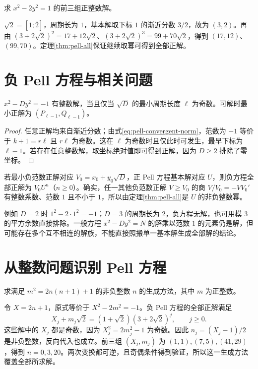 \documentclass[UTF8,12pt,a4paper,fontset=fandol]{ctexbook}
\begin{document}
\begin{example}
求 $x^2-2y^2=1$ 的前三组正整数解。
\end{example}
\begin{solve}
$\sqrt2=[1;\overline2]$，周期长为 $1$，基本解取下标 $1$ 的渐近分数 $3/2$，故为 $(3,2)$。再由 $(3+2\sqrt2)^2=17+12\sqrt2$、$(3+2\sqrt2)^3=99+70\sqrt2$，得到 $(17,12)$、$(99,70)$。定理\ref{thm:pell-all}保证继续取幂可得到全部正解。
\end{solve}

\section{负 Pell 方程与相关问题}

\begin{proposition}
\label{prop:negative-pell}
$x^2-Dy^2=-1$ 有整数解，当且仅当 $\sqrt D$ 的最小周期长度 $\ell$ 为奇数。可解时最小正解为 $(P_{\ell-1},Q_{\ell-1})$。
\end{proposition}
\begin{proof}
任意正解均来自渐近分数；由式\eqref{eq:pell-convergent-norm}，范数为 $-1$ 等价于 $k+1=r\ell$ 且 $r\ell$ 为奇数。这在 $\ell$ 为奇数时且仅此时可发生，最早下标为 $\ell-1$。若存在任意整数解，取坐标绝对值即可得到正解，因为 $D\ge2$ 排除了零坐标。
\end{proof}

若最小负范数正解对应 $V_0=x_0+y_0\sqrt D$，正 Pell 方程基本解对应 $U$，则负方程全部正解为 $V_0U^n$（$n\ge0$）。确实，任一其他负范数正解 $V\ge V_0$ 的商 $V/V_0=-VV_0'$ 有整数系数、范数 $1$ 且不小于 $1$，所以由定理\ref{thm:pell-all}是 $U$ 的非负整数幂。

例如 $D=2$ 时 $1^2-2\cdot1^2=-1$；$D=3$ 的周期长为 $2$，负方程无解，也可用模 $3$ 的平方余数直接排除。一般方程 $x^2-Dy^2=N$ 的解乘以范数 $1$ 的元素仍是解，但可能存在多个互不相连的解族，不能直接照搬单一基本解生成全部解的结论。

\section{从整数问题识别 Pell 方程}

\begin{example}[相邻整数的平方关系]
求满足 $m^2=2n(n+1)+1$ 的非负整数 $n$ 的生成方法，其中 $m$ 为正整数。
\end{example}
\begin{solve}
令 $X=2n+1$，原式等价于 $X^2-2m^2=-1$。负 Pell 方程的全部正解满足
\[
 X_j+m_j\sqrt2=(1+\sqrt2)(3+2\sqrt2)^j,\qquad j\ge0.
\]
这些解中的 $X_j$ 都是奇数，因为 $X_j^2=2m_j^2-1$ 为奇数。因此 $n_j=(X_j-1)/2$ 是非负整数，反向代入也成立。前三组 $(X_j,m_j)$ 为 $(1,1),(7,5),(41,29)$，得到 $n=0,3,20$。两次变换都可逆，且奇偶条件得到验证，所以这一生成方法覆盖全部所求解。
\end{solve}
\end{document}
